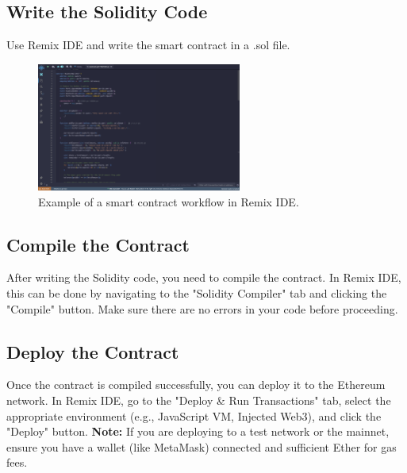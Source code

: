 \documentclass[12pt, a4paper]{article}
\begin{document}
\subsection{Write the Solidity Code}
Use Remix IDE and write the smart contract in a .sol file.
\begin{figure}[h]
    \centering
    \includegraphics[width=0.6\textwidth]{solidity_example.png}
    \caption{Example of a smart contract workflow in Remix IDE.}
    \label{fig:remix_smart_contract}
\end{figure}
\subsection{Compile the Contract}
After writing the Solidity code, you need to compile the contract. In Remix IDE, this can be done by navigating to the "Solidity Compiler" tab and clicking the "Compile" button. Make sure there are no errors in your code before proceeding.
\subsection{Deploy the Contract}
Once the contract is compiled successfully, you can deploy it to the Ethereum network. In Remix IDE, go to the "Deploy \& Run Transactions" tab, select the appropriate environment (e.g., JavaScript VM, Injected Web3), and click the "Deploy" button.
\textbf{Note:} If you are deploying to a test network or the mainnet, ensure you have a wallet (like MetaMask) connected and sufficient Ether for gas fees.
\end{document}
